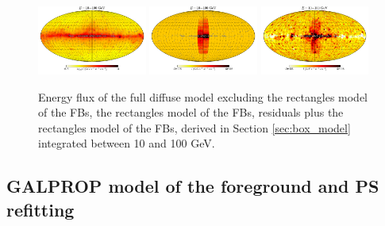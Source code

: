 \begin{figure}[h]
\centering
 \includegraphics[width=0.32\textwidth]{plots/Mollweide_Boxes_model_03-10GeV_flux_source_range_1_log.pdf}
\includegraphics[width=0.32\textwidth]{plots/Mollweide_Boxes_03-10GeV_flux_source_range_1.pdf}
 \includegraphics[width=0.32\textwidth]{plots/Mollweide_Boxes_residual+boxes_03-10GeV_flux_source_range_1.pdf}
 \caption{Energy flux of the full diffuse model excluding the rectangles model of the FBs,
 the rectangles model of the FBs, 
 residuals plus the rectangles model of the FBs,
 derived in Section \ref{sec:box_model}
 integrated between 10 and 100 GeV.}
 \label{fig:Maps_Rectangles}
\end{figure}

\subsection{GALPROP model of the foreground and PS refitting}
\label{sec:galprop_model}



